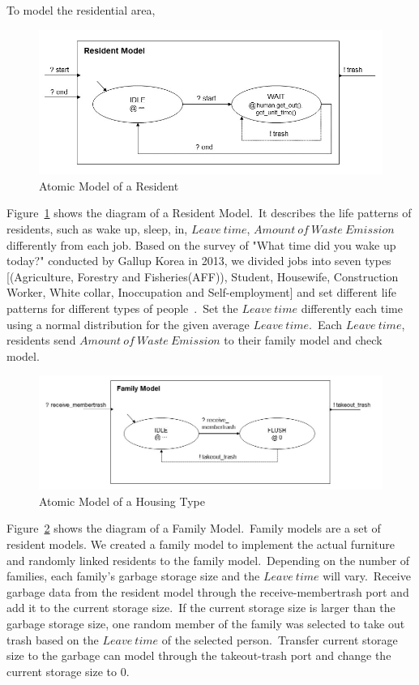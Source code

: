 \documentclass{scsSimAUDPaperFormat}
\begin{document}
To model the residential area,~\begin{figure}[!ht]
    \centering
    \includegraphics[width=1.0\columnwidth]{fig/resident_model.jpg}
    \caption{Atomic Model of a Resident}
    \label{Fig:residentmodel}
\end{figure}
Figure~\ref{Fig:residentmodel} shows the diagram of a Resident Model.~It describes the life patterns of residents, such as wake up, sleep, in, $Leave\ time$, $Amount\ of\ Waste\ Emission$ differently from each job. Based on the survey of "What time did you wake up today?" conducted by Gallup Korea in 2013, we divided jobs into seven types [(Agriculture, Forestry and Fisheries(AFF)), Student, Housewife, Construction Worker, White collar, Inoccupation and Self-employment] and set different life patterns for different types of people~\cite{gallup2013}.~Set the $Leave\ time$ differently each time using a normal distribution for the given average $Leave\ time$.~Each $Leave\ time$, residents send $Amount\ of\ Waste\ Emission$ to their family model and check model.
\begin{figure}[!ht]
    \centering
    \includegraphics[width=1.0\columnwidth]{fig/family_model.jpg}
    \caption{Atomic Model of a Housing Type}
    \label{Fig:Familymodel}
\end{figure}
Figure~\ref{Fig:Familymodel} shows the diagram of a Family Model.~Family models are a set of resident models. We created a family model to implement the actual furniture and randomly linked residents to the family model.~Depending on the number of families, each family's garbage storage size and the $Leave\ time$ will vary.~Receive garbage data from the resident model through the receive-membertrash port and add it to the current storage size.~If the current storage size is larger than the garbage storage size, one random member of the family was selected to take out trash based on the $Leave\ time$ of the selected person.~Transfer current storage size to the garbage can model through the takeout-trash port and change the current storage size to 0.
\end{document}
